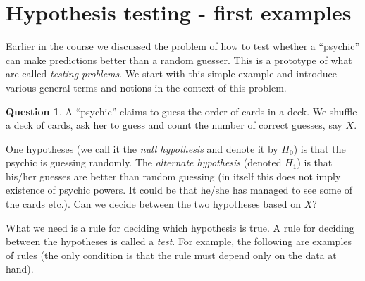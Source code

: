 \documentclass[preprint,  11pt]{amsart}
\theoremstyle{plain} %
\theoremstyle{definition} %
\newtheorem{question}[theorem]{Question}
\begin{document}
\section{Hypothesis testing - first examples}
Earlier in the course we discussed the problem of how to test whether a ``psychic'' can make predictions better than a random guesser. This is a prototype of what are called {\em testing problems}. We start with this simple example and introduce various general terms and notions in the context of this problem.




\begin{question} A ``psychic'' claims to guess the order of cards in a deck. We shuffle a deck of cards, ask her to guess and count the number of correct guesses, say $X$. 

\medskip
One hypotheses (we call it the {\em null hypothesis} and denote it by $H_{0}$) is that the psychic is guessing randomly. The {\em alternate hypothesis} (denoted $H_{1}$) is that his/her guesses are better than random guessing (in itself this does not imply existence of psychic powers. It could be that he/she has managed to see some of the cards etc.). Can we decide between the two hypotheses based on $X$?
\end{question}

What we need is a rule for deciding which hypothesis is true. A rule for deciding between the hypotheses is called a {\em test}. For example, the following are examples of rules (the only condition is that the rule must depend only on the data at hand).
\end{document}
